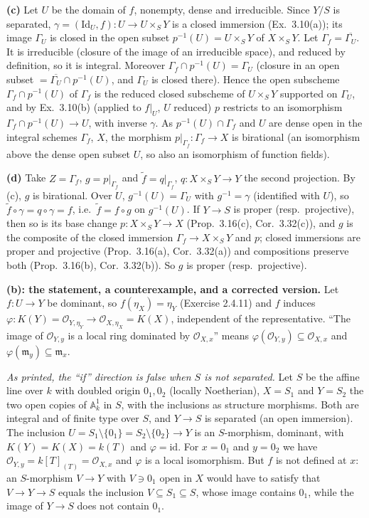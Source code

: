 \documentclass[11pt]{article}
\begin{document}
\textbf{(c)} Let $U$ be the domain of $f$, nonempty, dense and irreducible. Since $Y/S$ is separated, $\gamma=(\mathrm{Id}_U,f):U\to U\times_SY$ is a closed immersion (Ex.~3.10(a)); its image $\Gamma_U$ is closed in the open subset $p^{-1}(U)=U\times_SY$ of $X\times_SY$. Let $\Gamma_f=\overline{\Gamma_U}$. It is irreducible (closure of the image of an irreducible space), and reduced by definition, so it is integral. Moreover $\Gamma_f\cap p^{-1}(U)=\Gamma_U$ (closure in an open subset $=\overline{\Gamma_U}\cap p^{-1}(U)$, and $\Gamma_U$ is closed there). Hence the open subscheme $\Gamma_f\cap p^{-1}(U)$ of $\Gamma_f$ is the reduced closed subscheme of $U\times_SY$ supported on $\Gamma_U$, and by Ex.~3.10(b) (applied to $f|_U$, $U$ reduced) $p$ restricts to an isomorphism $\Gamma_f\cap p^{-1}(U)\to U$, with inverse $\gamma$. As $p^{-1}(U)\cap\Gamma_f$ and $U$ are dense open in the integral schemes $\Gamma_f$, $X$, the morphism $p|_{\Gamma_f}:\Gamma_f\to X$ is birational (an isomorphism above the dense open subset $U$, so also an isomorphism of function fields).

\textbf{(d)} Take $Z=\Gamma_f$, $g=p|_{\Gamma_f}$ and $\tilde f=q|_{\Gamma_f}$, $q:X\times_SY\to Y$ the second projection. By (c), $g$ is birational. Over $U$, $g^{-1}(U)=\Gamma_U$ with $g^{-1}=\gamma$ (identified with $U$), so $\tilde f\circ\gamma=q\circ\gamma=f$, i.e.\ $\tilde f=f\circ g$ on $g^{-1}(U)$. If $Y\to S$ is proper (resp.\ projective), then so is its base change $p:X\times_SY\to X$ (Prop.~3.16(c), Cor.~3.32(c)), and $g$ is the composite of the closed immersion $\Gamma_f\to X\times_SY$ and $p$; closed immersions are proper and projective (Prop.~3.16(a), Cor.~3.32(a)) and compositions preserve both (Prop.~3.16(b), Cor.~3.32(b)). So $g$ is proper (resp.\ projective).

\textbf{(b): the statement, a counterexample, and a corrected version.} Let $f:U\to Y$ be dominant, so $f(\eta_X)=\eta_Y$ (Exercise 2.4.11) and $f$ induces $\varphi:K(Y)=\mathcal O_{Y,\eta_Y}\to\mathcal O_{X,\eta_X}=K(X)$, independent of the representative. ``The image of $\mathcal O_{Y,y}$ is a local ring dominated by $\mathcal O_{X,x}$'' means $\varphi(\mathcal O_{Y,y})\subseteq\mathcal O_{X,x}$ and $\varphi(\mathfrak m_y)\subseteq\mathfrak m_x$.

\emph{As printed, the ``if'' direction is false when $S$ is not separated.} Let $S$ be the affine line over $k$ with doubled origin $0_1,0_2$ (locally Noetherian), $X=S_1$ and $Y=S_2$ the two open copies of $\mathbb A^1_k$ in $S$, with the inclusions as structure morphisms. Both are integral and of finite type over $S$, and $Y\to S$ is separated (an open immersion). The inclusion $U=S_1\setminus\{0_1\}=S_2\setminus\{0_2\}\to Y$ is an $S$-morphism, dominant, with $K(Y)=K(X)=k(T)$ and $\varphi=\mathrm{id}$. For $x=0_1$ and $y=0_2$ we have $\mathcal O_{Y,y}=k[T]_{(T)}=\mathcal O_{X,x}$ and $\varphi$ is a local isomorphism. But $f$ is not defined at $x$: an $S$-morphism $V\to Y$ with $V\ni0_1$ open in $X$ would have to satisfy that $V\to Y\to S$ equals the inclusion $V\subseteq S_1\subseteq S$, whose image contains $0_1$, while the image of $Y\to S$ does not contain $0_1$.
\end{document}
